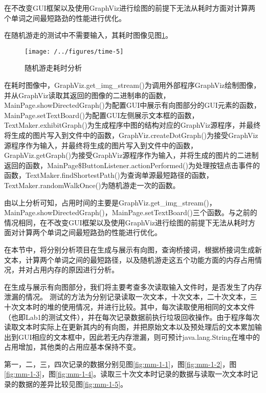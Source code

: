 
在不改变GUI框架以及使用GraphViz进行绘图的前提下无法从耗时方面对计算两个单词之间最短路劲的性能进行优化。

在随机游走的测试中不需要输入，其耗时图像见图\ref{fig:time-5}。

\begin{figure}
\centering
\texttt{[image: /../figures/time-5]}
\caption{随机游走耗时分析}
\label{fig:time-5}
\end{figure}

在耗时图像中，GraphViz.get\_img\_stream()为调用外部程序GraphViz绘制图像，并从GraphViz读取其返回的图像的二进制串的函数，MainPage.showDirectedGraph()为配置GUI中展示有向图部分的GUI元素的函数，MainPage.setTextBoard()为配置GUI左侧展示文本框的函数，TextMaker.exhibitGraph()为生成程序中图的结构对应的GraphViz源程序，并最终将生成的图片写入到文件中的函数，GraphViz.createDotGraph()为接受GraphViz源程序作为输入，并最终将生成的图片写入到文件中的函数，GraphViz.getGraph()为接受GraphViz源程序作为输入，并将生成的图片的二进制返回的函数，MainPage\$ButtonListener.actionPerformed()为处理按钮点击事件的函数，TextMaker.findShortestPath()为查询单源最短路径的函数，TextMaker.randomWalkOnce()为随机游走一次的函数。

由以上分析可知，占用时间的主要是GraphViz.get\_img\_stream()，MainPage.showDirectedGraph()，MainPage.setTextBoard()三个函数。与之前的情况相同，在不改变GUI框架以及使用GraphViz进行绘图的前提下无法从耗时方面对计算两个单词之间最短路劲的性能进行优化。

在本节中，将分别分析项目在生成与展示有向图，查询桥接词，根据桥接词生成新文本，计算两个单词之间的最短路径，以及随机游走这五个功能方面的内存占用情况，并对占用内存的原因进行分析。

在生成与展示有向图部分，我们将主要考查多次读取输入文件时，是否发生了内存泄漏的情况。
测试的方法为分别记录读取一次文本，十次文本，二十次文本，三十次文本时的堆的使用情况，并进行比较。其中，每次读取使用相同的文本文件（也即Lab1的测试文件），并在每次记录数据前执行垃圾回收操作。由于程序每次读取文本时实际上在更新其内的有向图，并把原始文本以及预处理后的文本累加输出到GUI相应的文本框中，因此若无内存泄漏，则可预计java.lang.String在堆中的占用增加，其他类的占用应基本保持不变。

第一，二，三，四次记录的数据分别见图\ref{fig:mm-1-1}，图\ref{fig:mm-1-2}，图\ref{fig:mm-1-3}，图\ref{fig:mm-1-4}。读取三十次文本时记录的数据与读取一次文本时记录的数据的差异比较见图\ref{fig:mm-1-5}。


